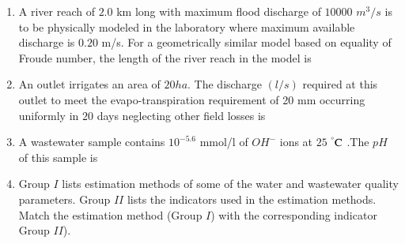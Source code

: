 \documentclass[journal]{IEEEtran}
\begin{document}
\begin{enumerate}
\item A river reach of $2.0$ km long with maximum flood discharge of $10000$ $m^{3}/s$ is to be physically modeled in the laboratory where maximum available discharge is $0.20$ m/s. For a geometrically similar model based on equality of Froude number, the length of the river reach  in the model is \hfill {}

\begin{enumerate}
\end{enumerate}

\item An outlet irrigates an area of $20  ha$. The discharge $(l/s)$ required at this outlet to meet the evapo-transpiration requirement of 20 mm occurring uniformly in $20$ days neglecting other field losses is \hfill {}

\begin{enumerate}
\end{enumerate}

\item A wastewater sample contains $10^{-5.6}$ mmol/l of $OH^{-}$ ions at $25$ $^\degree\text{C}$ .The $pH$ of this sample is \hfill {}

\begin{enumerate}
\end{enumerate}

\item Group $I$ lists estimation methods of some of the water and wastewater quality parameters. Group $II$ lists the indicators used in the estimation methods. Match the estimation method (Group $I$) with the corresponding indicator Group $II$). \hfill {}



\end{enumerate}
\end{document}
